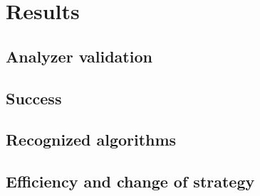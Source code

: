 \section{Results}
\label{sec:results}


\subsection{Analyzer validation}
\label{sec:validation}


\subsection{Success}
\label{sec:success}


\subsection{Recognized algorithms}
\label{sec:algorithms}


\subsection{Efficiency and change of strategy}
\label{sec:efficiency}

